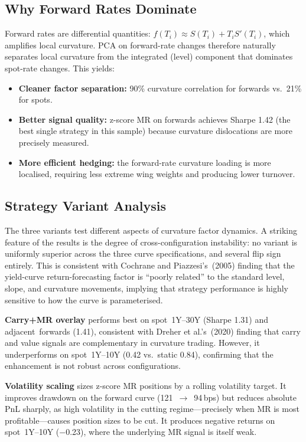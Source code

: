 \documentclass[11pt,a4paper]{article}
\begin{document}
\subsection{Why Forward Rates Dominate}
Forward rates are differential quantities:
$f(T_i) \approx S(T_i) + T_i S'(T_i)$, which amplifies local curvature.
PCA on forward-rate changes therefore naturally separates local
curvature from the integrated (level) component that dominates
spot-rate changes.  This yields:
\begin{itemize}
  \item \textbf{Cleaner factor separation:} 90\% curvature correlation
        for forwards vs.\ 21\% for spots.
  \item \textbf{Better signal quality:} z-score MR on forwards achieves
        Sharpe 1.42 (the best single strategy in this sample) because curvature
        dislocations are more precisely measured.
  \item \textbf{More efficient hedging:} the forward-rate curvature
        loading is more localised, requiring less extreme wing weights
        and producing lower turnover.
\end{itemize}

\subsection{Strategy Variant Analysis}
The three variants test different aspects of curvature factor dynamics.
A striking feature of the results is the degree of cross-configuration
instability: no variant is uniformly superior across the three curve
specifications, and several flip sign entirely.  This is consistent with
Cochrane and Piazzesi's~(2005) finding that the yield-curve return-forecasting
factor is ``poorly related'' to the standard level, slope, and curvature
movements, implying that strategy performance is highly sensitive to how the
curve is parameterised.

\textbf{Carry+MR overlay} performs best on spot~1Y--30Y (Sharpe 1.31) and
adjacent~forwards (1.41), consistent with Dreher et al.'s~(2020)
finding that carry and value signals are complementary in curvature
trading.  However, it underperforms on spot~1Y--10Y (0.42 vs.\ static
0.84), confirming that the enhancement is not robust across configurations.

\textbf{Volatility scaling} sizes z-score MR positions by a rolling
volatility target.  It improves drawdown on the forward curve
(121~$\to$~94\,bps) but reduces absolute PnL sharply, as high volatility
in the cutting regime---precisely when MR is most profitable---causes
position sizes to be cut.  It produces negative returns on spot~1Y--10Y
($-$0.23), where the underlying MR signal is itself weak.
\end{document}
